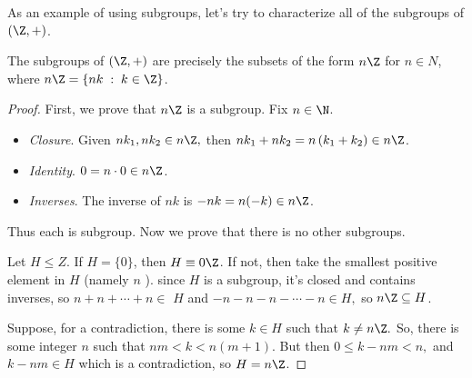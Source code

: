 \documentclass[a4paper]{scrartcl}
\begin{document}
As an example of using subgroups, let's try to characterize all of the subgroups of $(\Z, +)$.

\begin{theorem}[Subgroups of $\Z$]\label{thm:subgroups-of-z}
	The subgroups of $(\Z, +)$ are precisely the subsets of the form $n \Z$ for $n \in N$, where $n\Z = \{n k \; : \; k \in \Z\}$.
\end{theorem}
\begin{proof}
	First, we prove that $n \Z$ is a subgroup. Fix $n \in \N$.
	\begin{itemize}
		\item \emph{Closure}. Given $n k_{1}, n k_{2} \in n \Z,$ then $n k_{1}+n k_{2}=n\left(k_{1}+k_{2}\right) \in n \Z$.
		\item \emph{Identity}. $0 =n \cdot 0 \in n \Z$.
		\item \emph{Inverses}. The inverse of $n k$ is $-n k=n(-k) \in n \Z$.
	\end{itemize}
Thus each is subgroup. Now we prove that there is no other subgroups.

Let $H \leq Z$. If $H=\{0\}$, then $H \equiv 0 \Z$. If not, then take the smallest positive element in $H$ (namely $n$ ). since $H$ is a subgroup, it's closed and contains inverses, so $n+n+\cdots+n \in$ $H$ and $-n-n-n-\cdots-n \in H,$ so $n \Z \subseteq H$.

Suppose, for a contradiction, there is some $k \in H$ such that $k \neq n \Z .$ So, there is some integer $n$ such that $n m<k<n(m+1) .$ But then $0 \leq k-n m<n,$ and $k-n m \in H$ which is a contradiction, so $H=n \Z$.
\end{proof}
\end{document}
